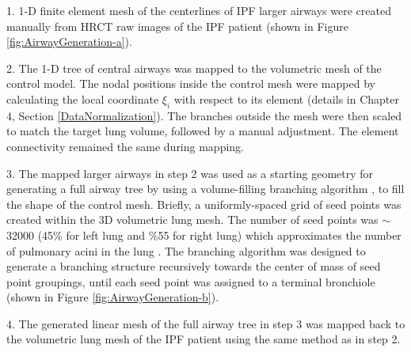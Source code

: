 1. 1-D finite element mesh of the centerlines of IPF larger airways were created manually from HRCT raw images of the IPF patient (shown in Figure \ref{fig:AirwayGeneration-a}).

2. The 1-D tree of central airways was mapped to the volumetric mesh of the control model. The nodal positions inside the control mesh were mapped by calculating the local coordinate $\xi_{i}$ with respect to its element (details in Chapter 4, Section \ref{DataNormalization}). The branches outside the mesh were then scaled to match the target lung volume, followed by a manual adjustment. The element connectivity remained the same during mapping.

3. The mapped larger airways in step 2 was used as a starting geometry for generating a full airway tree by using a volume-filling branching algorithm \citep{tawhai2004ct}, to fill the shape of the control mesh. Briefly, a uniformly-spaced grid of seed points was created within the 3D volumetric lung mesh. The number of seed points was $\sim$ 32000 (45\% for left lung and \%55 for right lung) which approximates the number of pulmonary acini in the lung \citep{haefeli1988morphometry}. The branching algorithm was designed to generate a branching structure recursively towards the center of mass of seed point groupings, until each seed point was assigned to a terminal bronchiole (shown in Figure \ref{fig:AirwayGeneration-b}). 

4. The generated linear mesh of the full airway tree in step 3 was mapped back to the volumetric lung mesh of the IPF patient using the same method as in step 2.

